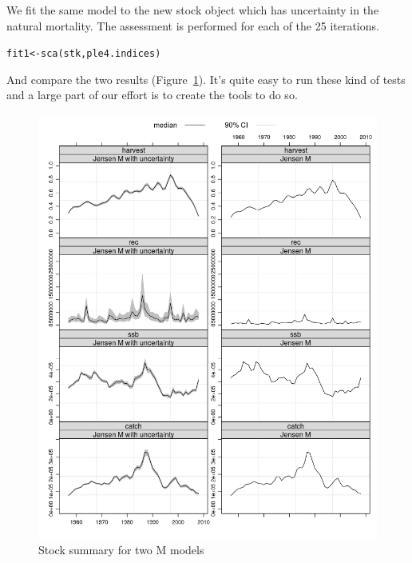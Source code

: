 \documentclass[a4paper,english,10pt]{article}\usepackage[]{graphicx}\usepackage[]{color}
\makeatletter
\newcommand{\hlstd}[1]{\textcolor[rgb]{0.196,0.196,0.196}{#1}}%
\newcommand{\hlkwb}[1]{\textcolor[rgb]{0.627,0,0.314}{#1}}%
\newcommand{\hlkwd}[1]{\textcolor[rgb]{0.78,0.227,0.412}{#1}}%
\newenvironment{kframe}{%
 \def\at@end@of@kframe{}%
 \ifinner\ifhmode%
  \def\at@end@of@kframe{\end{minipage}}%
  \begin{minipage}{\columnwidth}%
 \fi\fi%
 \def\FrameCommand##1{\hskip\@totalleftmargin \hskip-\fboxsep
 \colorbox{shadecolor}{##1}\hskip-\fboxsep
     \hskip-\linewidth \hskip-\@totalleftmargin \hskip\columnwidth}%
 \MakeFramed {\advance\hsize-\width
   \@totalleftmargin\z@ \linewidth\hsize
   \@setminipage}}%
 {\par\unskip\endMakeFramed%
 \at@end@of@kframe}
\newenvironment{knitrout}{}{} %
\makeatother
\begin{document}
We fit the same model to the new stock object which has uncertainty in the natural mortality.
The assessment is performed for each of the 25 iterations.

\begin{knitrout}
\color{fgcolor}\begin{kframe}
\begin{alltt}
\hlstd{fit1} \hlkwb{<-} \hlkwd{sca}\hlstd{(stk, ple4.indices)}
\end{alltt}
\end{kframe}
\end{knitrout}

And compare the two results (Figure~\ref{fig:mprop}). It's quite easy to run these kind of tests and a large part of our effort is to create the tools to do so.

\begin{knitrout}
\color{fgcolor}\begin{figure}[H]

{\centering \includegraphics[width=.9\linewidth]{figure/mprop-1} 

}

\caption[Stock summary for two M models]{Stock summary for two M models}\label{fig:mprop}
\end{figure}


\end{knitrout}
\end{document}
